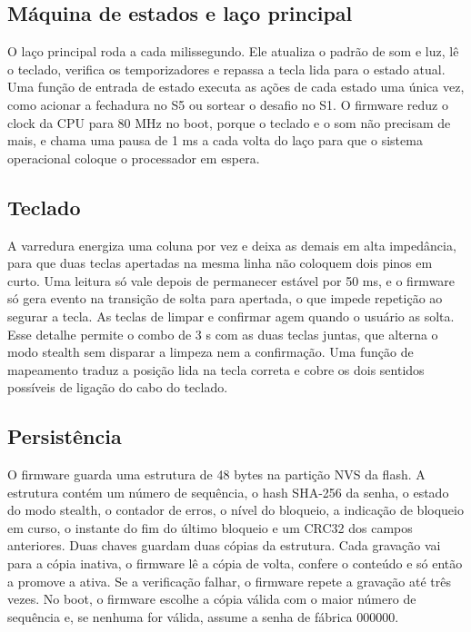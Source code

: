 \documentclass[11pt,a4paper]{article}
\begin{document}
\subsection{Máquina de estados e laço principal}

O laço principal roda a cada milissegundo. Ele atualiza o padrão de som e luz, lê o teclado, verifica os temporizadores e repassa a tecla lida para o estado atual. Uma função de entrada de estado executa as ações de cada estado uma única vez, como acionar a fechadura no S5 ou sortear o desafio no S1. O firmware reduz o clock da CPU para 80 MHz no boot, porque o teclado e o som não precisam de mais, e chama uma pausa de 1 ms a cada volta do laço para que o sistema operacional coloque o processador em espera.

\subsection{Teclado}

A varredura energiza uma coluna por vez e deixa as demais em alta impedância, para que duas teclas apertadas na mesma linha não coloquem dois pinos em curto. Uma leitura só vale depois de permanecer estável por 50 ms, e o firmware só gera evento na transição de solta para apertada, o que impede repetição ao segurar a tecla. As teclas de limpar e confirmar agem quando o usuário as solta. Esse detalhe permite o combo de 3 s com as duas teclas juntas, que alterna o modo stealth sem disparar a limpeza nem a confirmação. Uma função de mapeamento traduz a posição lida na tecla correta e cobre os dois sentidos possíveis de ligação do cabo do teclado.

\subsection{Persistência}

O firmware guarda uma estrutura de 48 bytes na partição NVS da flash. A estrutura contém um número de sequência, o hash SHA-256 da senha, o estado do modo stealth, o contador de erros, o nível do bloqueio, a indicação de bloqueio em curso, o instante do fim do último bloqueio e um CRC32 dos campos anteriores. Duas chaves guardam duas cópias da estrutura. Cada gravação vai para a cópia inativa, o firmware lê a cópia de volta, confere o conteúdo e só então a promove a ativa. Se a verificação falhar, o firmware repete a gravação até três vezes. No boot, o firmware escolhe a cópia válida com o maior número de sequência e, se nenhuma for válida, assume a senha de fábrica 000000.
\end{document}
